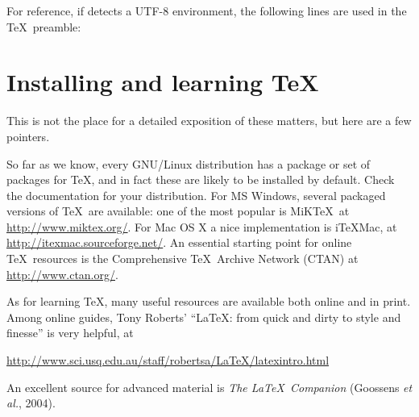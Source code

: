 For reference, if  detects a UTF-8 environment, the
following lines are used in the \TeX\ preamble:
%
\begin{code}
\usepackage{ucs}
\usepackage[utf8x]{inputenc}
\end{code}


\section{Installing and learning \TeX}
\label{tex-install}

This is not the place for a detailed exposition of these matters, but
here are a few pointers.  

So far as we know, every GNU/Linux distribution has a package or set
of packages for \TeX, and in fact these are likely to be installed by
default.  Check the documentation for your distribution.  For MS
Windows, several packaged versions of \TeX\ are available: one of the
most popular is MiK\TeX\, at \url{http://www.miktex.org/}.  For Mac OS
X a nice implementation is i\TeX{}Mac, at
\url{http://itexmac.sourceforge.net/}.  An essential starting point for
online \TeX\ resources is the Comprehensive
\TeX\ Archive Network (CTAN) at \url{http://www.ctan.org/}.

As for learning \TeX, many useful resources are available both online
and in print.  Among online guides, Tony Roberts' ``\LaTeX: from quick
and dirty to style and finesse'' is very helpful, at

\url{http://www.sci.usq.edu.au/staff/robertsa/LaTeX/latexintro.html}

An excellent source for advanced material is \emph{The \LaTeX\
  Companion} (Goossens \textit{et al.}, 2004).


